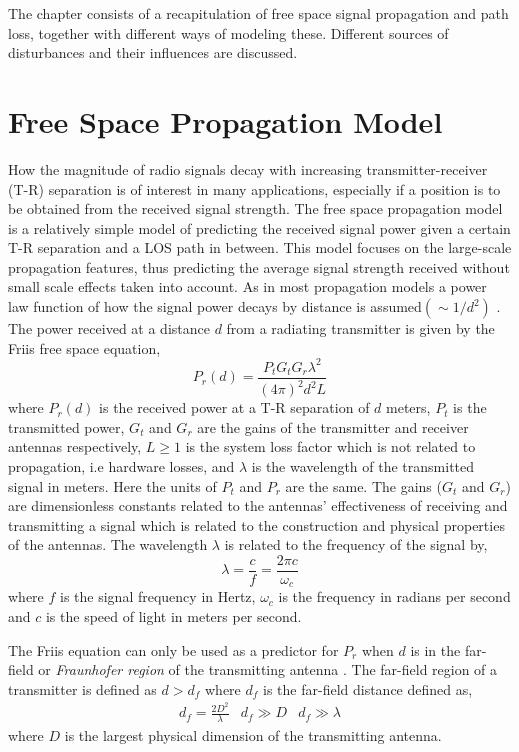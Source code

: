 \documentclass{LTHthesis}
\begin{document}
The chapter consists of a recapitulation of free space signal propagation and path loss, together with different ways of modeling these. Different sources of disturbances and their influences are discussed. 
%
\section{Free Space Propagation Model}
%
How the magnitude of radio signals decay with increasing transmitter-receiver (T-R) separation is of interest in many applications, especially if a position is to be obtained from the received signal strength. The free space propagation model is a relatively simple model of predicting the received signal power given a certain T-R separation and a LOS path in between. This model focuses on the large-scale propagation features, thus predicting the average signal strength received without small scale effects taken into account. As in most propagation models a power law function of how the signal power decays by distance is assumed$\left(\sim{1/d^2}\right)$ \cite{rappaport96}. The power received at a distance $d$ from a radiating transmitter is given by the Friis free space equation,
%
\begin{equation}
P_r(d)=\frac{P_tG_tG_r\lambda^2}{(4\pi)^2d^2L}\label{equation:friis_equation}
\end{equation}
%
where $P_r(d)$ is the received power at a T-R separation of $d$ meters, $P_t$ is the transmitted power, $G_t$ and $G_r$ are the gains of the transmitter and receiver antennas respectively, $L\geq1$ is the system loss factor which is not related to propagation, i.e hardware losses, and $\lambda$ is the wavelength of the transmitted signal in meters. Here the units of $P_t$ and $P_r$ are the same. The gains ($G_t$ and $G_r$) are dimensionless constants related to the antennas' effectiveness of receiving and transmitting a signal which is related to the construction and physical properties of the antennas. The wavelength $\lambda$ is related to the frequency of the signal by,
\begin{equation}
\lambda=\frac{c}{f}=\frac{2\pi c}{\omega_c}
\end{equation} 
%
where $f$ is the signal frequency in Hertz, $\omega_c$ is the frequency in radians per second and $c$ is the speed of light in meters per second. 

The Friis equation can only be used as a predictor for $P_r$ when $d$ is in the far-field or \emph{Fraunhofer region} of the transmitting antenna \cite{rappaport96}. The far-field region of a transmitter is defined as $d>d_f$ where $d_f$ is the far-field distance defined as,
%
\begin{eqnarray}
d_f=\frac{2D^2}{\lambda} & d_f\gg D & d_f\gg \lambda \label{equation:frau_dist}
\end{eqnarray}
%
where $D$ is the largest physical dimension of the transmitting antenna.
\end{document}
